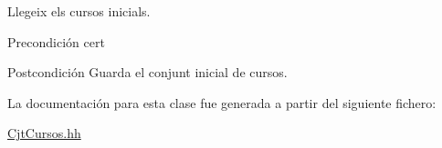 Llegeix els cursos inicials. 

\begin{DoxyPrecond}{Precondición}
cert 
\end{DoxyPrecond}
\begin{DoxyPostcond}{Postcondición}
Guarda el conjunt inicial de cursos. 
\end{DoxyPostcond}


La documentación para esta clase fue generada a partir del siguiente fichero\+:\begin{DoxyCompactItemize}
\item 
\mbox{\hyperlink{_cjt_cursos_8hh}{Cjt\+Cursos.\+hh}}\end{DoxyCompactItemize}
